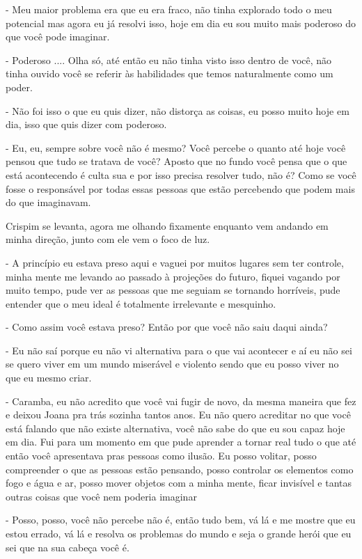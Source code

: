 - Meu maior problema era que eu era fraco, não tinha explorado todo o meu potencial mas agora eu já resolvi isso, hoje em dia eu sou muito mais poderoso do que você pode imaginar.

- Poderoso .... Olha só, até então eu não tinha visto isso dentro de você, não tinha ouvido você se referir às habilidades que temos naturalmente como um poder.

- Não foi isso o que eu quis dizer, não distorça as coisas, eu posso muito hoje em dia, isso que quis dizer com poderoso.

- Eu, eu, sempre sobre você não é mesmo? Você percebe o quanto até hoje você pensou que tudo se tratava de você? Aposto que no fundo você pensa que o que está acontecendo é culta sua e por isso precisa resolver tudo, não é? Como se você fosse o responsável por todas essas pessoas que estão percebendo que podem mais do que imaginavam.


Crispim se levanta, agora me olhando fixamente enquanto vem andando em minha direção, junto com ele vem o foco de luz.

- A princípio eu estava preso aqui e vaguei por muitos lugares sem ter controle, minha mente me levando ao passado à projeções do futuro, fiquei vagando por muito tempo, pude ver as pessoas que me seguiam se tornando horríveis, pude entender que o meu ideal é totalmente irrelevante e mesquinho.

- Como assim você estava preso? Então por que você não saiu daqui ainda?

- Eu não saí porque eu não vi alternativa para o que vai acontecer e aí eu não sei se quero viver em um mundo miserável e violento sendo que eu posso viver no que eu mesmo criar.

- Caramba, eu não acredito que você vai fugir de novo, da mesma maneira que fez e deixou Joana pra trás sozinha tantos anos. Eu não quero acreditar no que você está falando que não existe alternativa, você não sabe do que eu sou capaz hoje em dia. Fui para um momento em que pude aprender a tornar real tudo o que até então você apresentava pras pessoas como ilusão. Eu posso volitar, posso compreender o que as pessoas estão pensando, posso controlar os elementos como fogo e água e ar, posso mover objetos com a minha mente, ficar invisível e tantas outras coisas que você nem poderia imaginar

- Posso, posso, você não percebe não é, então tudo bem, vá lá e me mostre que eu estou errado, vá lá e resolva os problemas do mundo e seja o grande herói que eu sei que na sua cabeça você é.


